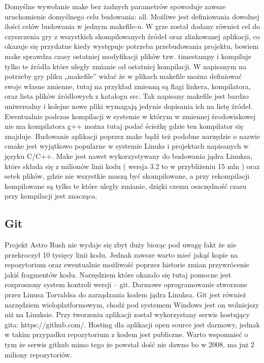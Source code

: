Domyślne wywołanie make bez żadnych parametrów spowoduje zawsze uruchomienie domyślnego celu budowania: all. Możliwe jest definiowania dowolnej ilości
celów budowania w jednym makefile-u. W grze został dodany również cel do czyszczenia gry z wszystkich skompilowanych źródeł oraz zlinkowanej
aplikacji, co okazuje się przydatne kiedy występuje potrzeba przebudowania projektu, bowiem make sprawdza czasy ostatniej modyfikacji  plików tzw.
timestampy i kompiluje tylko te źródła które uległy zmianie od ostatniej kompilacji.
	W napisanym na potrzeby gry pliku „makefile” widać że w plikach makefile można definiować swoje własne zmienne, tutaj na przykład zmienną są
flagi linkera, kompilatora, oraz lista plików źródłowych z katalogu src. Tak napisany makefile jest bardzo uniwersalny i kolejne nowe pliki wymagają
jedynie dopisania ich na listę źródeł. Ewentualnie podczas kompilacji w systemie w którym w zmiennej środowiskowej nie ma kompilatora g++ można tutaj
podać ścieżkę gdzie ten kompilator się znajduje.
	Budowanie aplikacji poprzez make bądź też podobne narzędzie o nazwie cmake jest wyjątkowo popularne w systemie Linuks i projektach napisanych
w języku C/C++. Make jest nawet wykorzystywany do budowania jądra Linuksa, które składa się z milionów linii kodu ( wersja 3.2 to w przybliżeniu 15
mln ) oraz setek plików, gdzie nie wszystkie muszą być skompilowane, a przy rekompilacji kompilowane są tylko te które uległy zmianie, dzięki czemu
oszczędność czasu przy kompilacji jest znacząca.


\subsection{Git}
Projekt Astro Rush nie wydaje się zbyt duży biorąc pod uwagę fakt że nie przekroczył 10 tysięcy linii kodu. Jednak zawsze warto mieć jakąś kopie na
repozytorium oraz ewentualnie możliwość poprzez historie  zmian przywrócenie jakiś fragmentów kodu. Narzędziem które okazało się tutaj pomocne jest
rozproszony system kontroli wersji – git. Darmowe oprogramowanie stworzone przez Linusa Torvaldsa do zarządzania kodem jądra Linuksa. Git jest również narzędziem wieloplatformowym, chodź pod systemem Windows jest on wolniejszy niż na Linuksie. Przy tworzeniu aplikacji został wykorzystany serwis
hostujący gita: https://github.com/. Hosting dla aplikacji open source jest darmowy, jednak w takim przypadku repozytorium z kodem jest publiczne.
Warto wspomnieć o tym że serwis github mimo tego że powstał dość nie dawno bo w 2008, ma już 2 miliony repozytoriów.
	
